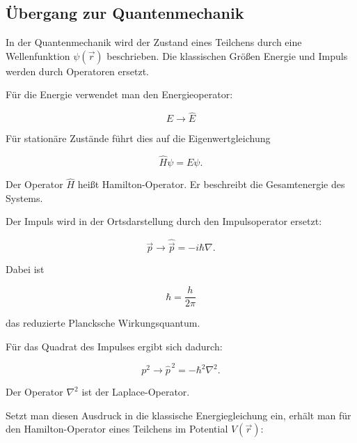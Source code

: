\subsection*{Übergang zur Quantenmechanik}

In der Quantenmechanik wird der Zustand eines Teilchens durch eine
Wellenfunktion \(\psi(\vec r)\) beschrieben. Die
klassischen Größen Energie und Impuls werden durch Operatoren ersetzt.

Für die Energie verwendet man den Energieoperator:

\begin{equation}
	E \rightarrow \hat{E}
	\label{eq:app_energie_operator}
\end{equation}

Für stationäre Zustände führt dies auf die Eigenwertgleichung

\begin{equation}
	\hat{H}\psi = E\psi .
	\label{eq:app_stationaere_schroedingergleichung_allgemein}
\end{equation}

Der Operator \(\hat{H}\) heißt Hamilton-Operator. Er
beschreibt die Gesamtenergie des Systems.

Der Impuls wird in der Ortsdarstellung durch den Impulsoperator
 ersetzt:

\begin{equation}
	\vec p \rightarrow \hat{\vec p} = -i\hbar \nabla .
	\label{eq:app_impulsoperator}
\end{equation}

Dabei ist

\begin{equation}
	\hbar = \frac{h}{2\pi}
	\label{eq:app_hquer}
\end{equation}

das reduzierte Plancksche Wirkungsquantum.

Für das Quadrat des Impulses ergibt sich dadurch:

\begin{equation}
	p^2 \rightarrow \hat{p}^{\,2}
	= -\hbar^2 \nabla^2 .
	\label{eq:app_impulsquadrat_operator}
\end{equation}

Der Operator \(\nabla^2\) ist der Laplace-Operator.

Setzt man diesen Ausdruck in die klassische Energiegleichung ein, erhält man
für den Hamilton-Operator eines Teilchens im Potential \(V(\vec r)\):

